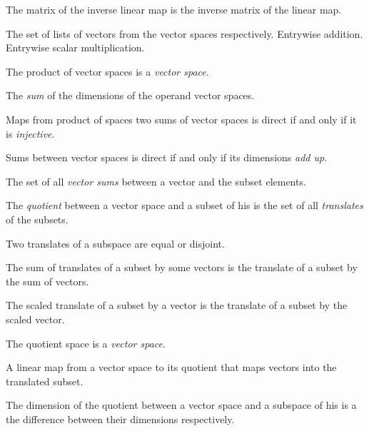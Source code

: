\begin{multicols}{3}
  
  The matrix of the inverse linear map is the inverse matrix of the linear map.


  The set of lists of vectors from the vector spaces respectively.
  Entrywise addition.
  Entrywise scalar multiplication.

  The product of vector spaces is a \textit{vector space}.

  The \textit{sum} of the dimensions of the operand vector spaces.

  Maps from product of spaces two sums of vector spaces is direct if and only if it is \textit{injective}.

  Sums between vector spaces is direct if and only if its dimensions \textit{add up}.

  The set of all \textit{vector sums} between a vector and the subset elements.

  The \textit{quotient} between a vector space and a subset of his is the set of all
  \textit{translates} of the subsets.

  Two translates of a subspace are equal or disjoint.

  The sum of translates of a subset by some vectors
  is the translate of a subset by the sum of vectors.
  
  The scaled translate of a subset by a vector
  is the translate of a subset by the scaled vector.

  The quotient space is a \textit{vector space}.

  A linear map from a vector space to its quotient that maps vectors
  into the translated subset.

  The dimension of the quotient between a vector space and a subspace of his
  is a the difference between their dimensions respectively.


\end{multicols}
